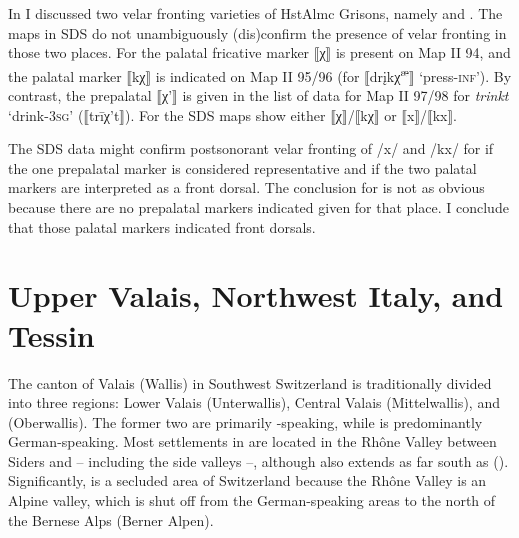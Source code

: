 {In  I discussed two velar fronting varieties of HstAlmc Grisons, namely  and . The maps in SDS do not unambiguously (dis)confirm the presence of velar fronting in those two places. For  the palatal fricative marker ⟦χ⟧ is present on Map II 94, and the palatal  marker ⟦kχ⟧ is indicated on Map II 95/96 (for ⟦drįkχ\textsuperscript{æ}⟧ ‘press-\textsc{inf}’). By contrast, the prepalatal ⟦χ'⟧ is given in the list of data for Map II 97/98 for \textit{trinkt} ‘drink-\textsc{3sg}’ (⟦trīχ't⟧). For  the SDS maps show either ⟦χ⟧/⟦kχ⟧ or ⟦x⟧/⟦kx⟧.

The SDS data might confirm postsonorant velar fronting of /x/ and /kx/ for  if the one prepalatal marker is considered representative and if the two palatal markers are interpreted as a front dorsal. The conclusion for  is not as obvious because there are no prepalatal markers indicated given for that place. I conclude that those palatal markers indicated front dorsals.

\section{Upper Valais, Northwest Italy, and Tessin}\label{sec:15.8}\largerpage

The canton of Valais (Wallis) in Southwest Switzerland is traditionally divided into three regions: Lower Valais (Unterwallis), Central Valais (Mittelwallis), and  (Oberwallis). The former two are primarily -speaking, while  is predominantly German-speaking. Most settlements in  are located in the Rhône Valley between Siders and  -- including the side valleys --, although  also extends as far south as  (). Significantly,  is a secluded area of Switzerland because the Rhône Valley is an Alpine valley, which is shut off from the German-speaking areas to the north of the Bernese Alps (Berner Alpen).

}
